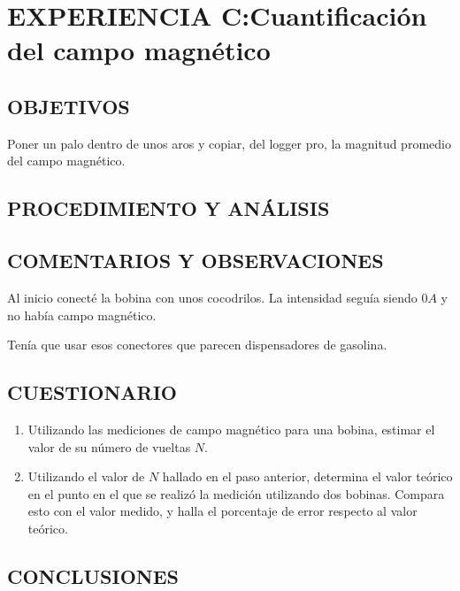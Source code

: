 \documentclass[10pt, twoside]{article}
\begin{document}
\section{EXPERIENCIA C:Cuantificación del campo magnético}%

\subsection{OBJETIVOS}%

Poner un palo dentro de unos aros y copiar, del logger pro, la magnitud promedio
del campo magnético.

\subsection{PROCEDIMIENTO Y ANÁLISIS}%

\subsection{COMENTARIOS Y OBSERVACIONES}%

Al inicio conecté la bobina con unos cocodrilos.
La intensidad seguía siendo $0A$ y no había campo magnético.

Tenía que usar esos conectores que parecen dispensadores de gasolina.

\subsection{CUESTIONARIO}%
\begin{enumerate}[label=\roman*]
	\item Utilizando las mediciones de campo magnético para una bobina,
		estimar el valor de su número de vueltas $N$.
	\item Utilizando el valor de $N$ hallado en el paso anterior,
		determina el valor teórico en el punto en el que se realizó la medición
		utilizando dos bobinas.
		Compara esto con el valor medido,
		y halla el porcentaje de error respecto al valor teórico.
\end{enumerate}

\subsection{CONCLUSIONES}%
\end{document}
